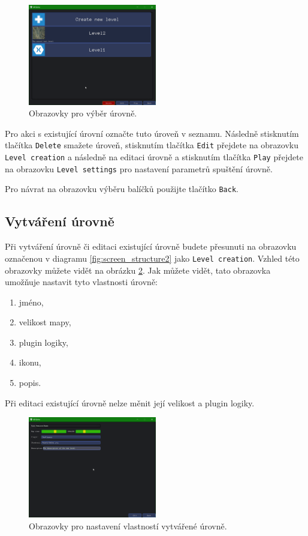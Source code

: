\begin{figure}[h]
	\centering
	\includegraphics[width=0.5\textwidth]{img/LevelPickingScreen.png}
	\caption{Obrazovky pro výběr úrovně.}
	\label{fig:levelpicking}
\end{figure}

Pro akci s existující úrovní označte tuto úroveň v seznamu. Následně stisknutím tlačítka \texttt{Delete} smažete úroveň, stisknutím tlačítka \texttt{Edit} přejdete na obrazovku \texttt{Level creation} a následně na editaci úrovně a stisknutím tlačítka \texttt{Play} přejdete na obrazovku \texttt{Level settings} pro nastavení parametrů spuštění úrovně.

Pro návrat na obrazovku výběru balíčků použijte tlačítko \texttt{Back}.
\subsection{Vytváření úrovně}
Při vytváření úrovně či editaci existující úrovně budete přesunuti na obrazovku označenou v diagramu \ref{fig:screen_structure2} jako \texttt{Level creation}. Vzhled této obrazovky můžete vidět na obrázku \ref{fig:levelcreation}. Jak můžete vidět, tato obrazovka umožňuje nastavit tyto vlastnosti úrovně:

\begin{enumerate}
	\item jméno,
	\item velikost mapy,
	\item plugin logiky,
	\item ikonu,
	\item popis.
\end{enumerate}

Při editaci existující úrovně nelze měnit její velikost a plugin logiky.

\begin{figure}[h]
	\centering
	\includegraphics[width=0.5\textwidth]{img/LevelCreationScreen.png}
	\caption{Obrazovky pro nastavení vlastností vytvářené úrovně.}
	\label{fig:levelcreation}
\end{figure}

